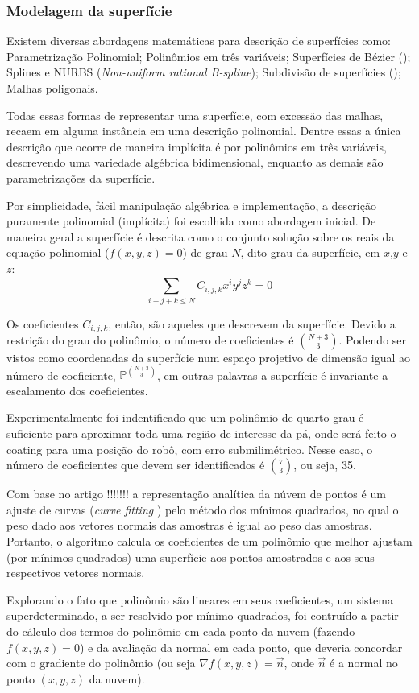 \subsubsection{Modelagem da superfície}\label{modelagem}

Existem diversas abordagens matemáticas para descrição de superfícies como:
Parametrização Polinomial; Polinômios em três variáveis; Superfícies de
Bézier (\cite{farin2002curves}); Splines e NURBS (\textit{Non-uniform rational
B-spline}); Subdivisão de superfícies (\cite{peters2008subdivision}); Malhas
poligonais.

Todas essas formas de representar uma superfície, com excessão das malhas,
recaem em alguma instância em uma descrição polinomial. Dentre essas a única
descrição que ocorre de maneira implícita é por polinômios em três variáveis,
descrevendo uma variedade algébrica bidimensional, enquanto as demais são
parametrizações da superfície. 

Por simplicidade, fácil manipulação algébrica e implementação, a descrição
puramente polinomial (implícita) foi escolhida como abordagem inicial. De
maneira geral a superfície é descrita como o conjunto solução sobre os
reais da equação polinomial ($f(x,y,z)=0$) de grau $N$, dito grau da
superfície, em $x$,$y$ e $z$:
\[\sum\limits_{i+j+k \leq N}^{} C_{i,j,k}x^iy^jz^k = 0\]

Os coeficientes $C_{i,j,k}$, então, são aqueles que descrevem da superfície.
Devido a restrição do grau do polinômio, o número de coeficientes é
$\binom{N+3}{3}$. Podendo ser vistos como coordenadas da superfície num espaço
projetivo de dimensão igual ao número de coeficiente,
$\mathbb{P}^{\binom{N+3}{3}}$, em outras palavras a superfície é invariante a
escalamento dos coeficientes.

Experimentalmente foi indentificado que um polinômio de quarto grau é suficiente
para aproximar toda uma região de interesse da pá, onde será feito o coating
para uma posição do robô, com erro submilimétrico. Nesse caso, o número de
coeficientes que devem ser identificados é $\binom{7}{3}$, ou seja, 35.

Com base no artigo !!!!!!! a representação analítica da núvem de pontos é um
ajuste de curvas (\textit{curve fitting} \cite{arlinghaus1994practical}) pelo
método dos mínimos quadrados, no qual o peso dado aos vetores normais
das amostras é igual ao peso das amostras. Portanto, o algoritmo calcula os
coeficientes de um polinômio que melhor ajustam (por mínimos quadrados) uma
superfície aos pontos amostrados e aos seus respectivos vetores normais.

Explorando o fato que polinômio são lineares em seus coeficientes, um sistema
superdeterminado, a ser resolvido por mínimo quadrados, foi contruído a partir
do cálculo dos termos do polinômio em cada ponto da nuvem (fazendo $f(x,y,z)=0$)
e da avaliação da normal em cada ponto, que deveria concordar com o gradiente do
polinômio (ou seja $\nabla f(x,y,z) = \overrightarrow{n}$, onde
$\overrightarrow{n}$ é a normal no ponto $(x,y,z)$ da nuvem).



% 
